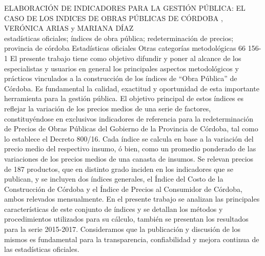 \A
{ELABORACIÓN DE INDICADORES PARA LA GESTIÓN PÚBLICA: EL CASO DE LOS INDICES DE OBRAS PÚBLICAS DE CÓRDOBA}
{, VERÓNICA ARIAS y MARIANA DÍAZ}
{
\\}
{estadísticas oficiales; índices de obra pública; redeterminación de precios; provincia de córdoba} 
 {Estadísticas oficiales} 
 {Otras categorías metodológicas} 
 {66} 
 {156-1}
{El presente trabajo tiene como objetivo difundir y poner al alcance de los especialistas y usuarios en general los principales aspectos metodológicos y prácticos vinculados a la construcción de los índices de “Obra Pública” de Córdoba. Es fundamental la calidad, exactitud y oportunidad de esta importante herramienta para la gestión pública. El objetivo principal de estos índices es reflejar la variación de los precios medios de una serie de factores, constituyéndose en exclusivos indicadores de referencia para la redeterminación de Precios de Obras Públicas del Gobierno de la Provincia de Córdoba, tal como lo establece el Decreto 800/16. Cada índice se calcula en base a la variación del precio medio del respectivo insumo, ó bien, como un promedio ponderado de las variaciones de los precios medios de una canasta de insumos. Se relevan precios de 187 productos, que en distinto grado inciden en los indicadores que se publican, y se incluyen dos índices generales, el Índice del Costo de la Construcción de Córdoba y el Índice de Precios al Consumidor de Córdoba, ambos relevados mensualmente. En el presente trabajo se analizan las principales características de este conjunto de índices y se detallan los métodos y procedimientos utilizados para su cálculo, también se presentan los resultados para la serie 2015-2017. Consideramos que la publicación y discusión de los mismos es fundamental para la transparencia, confiabilidad y mejora continua de las estadísticas oficiales. }

